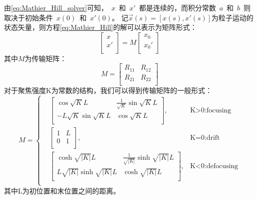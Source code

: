 由\ref{eq:Mathier_Hill_solver}可知，~$x$~和~$x'$~都是连续的，而积分常数~$a$~和~$b$~则取决于初始条件~$x(0)$~和~$x'(0)$。
记$\vec{x}(s)=[x(s),x'(s)]$为粒子运动的状态矢量，则方程\ref{eq:Mathier_Hill}的解可以表示为矩阵形式：
\begin{equation}
    \label{eq:Mathier_Hill_solver_matrix}
    \begin{bmatrix}
      x   \\
      x'  \\
    \end{bmatrix}
    =
    M
    \begin{bmatrix}
      x_0   \\
      x_0'  \\
    \end{bmatrix}
\end{equation}
其中$M$为传输矩阵：
\begin{equation}
    \label{eq:Mathier_Hill_tranfermap}
    M=
    \begin{bmatrix}
      R_{11} & R_{12}  \\
      R_{21} & R_{22}  \\
    \end{bmatrix}
\end{equation}
对于聚焦强度K为常数的结构，我们可以得到传输矩阵的一般形式：
\begin{equation}
    \label{eq:Mathier_Hill_tranfermap_K}
    M=\left\{
    \begin{aligned}
        &\begin{bmatrix}
          \cos \sqrt{K}L                & \frac{1}{\sqrt{K}} \sin \sqrt{K}L  \\
          -L{\sqrt{K}} \sin \sqrt{K}L    & \cos \sqrt{K}L   \\
        \end{bmatrix}
        ,& \text{K>0:focusing}  \\
        &\begin{bmatrix}
          1 & L  \\
          0 & 1  \\
        \end{bmatrix}
        ,& \text{K=0:drift}  \\
        &\begin{bmatrix}
          \cosh \sqrt{|K|}L                & \frac{1}{\sqrt{|K|}} \sinh \sqrt{|K|}L  \\
          L{\sqrt{|K|}} \sinh \sqrt{|K|}L    & \cosh \sqrt{|K|}L   \\
        \end{bmatrix}
        ,& \text{K<0:defocusing}  \\
    \end{aligned}
    \right.
\end{equation}
其中L为初位置和末位置之间的距离。

